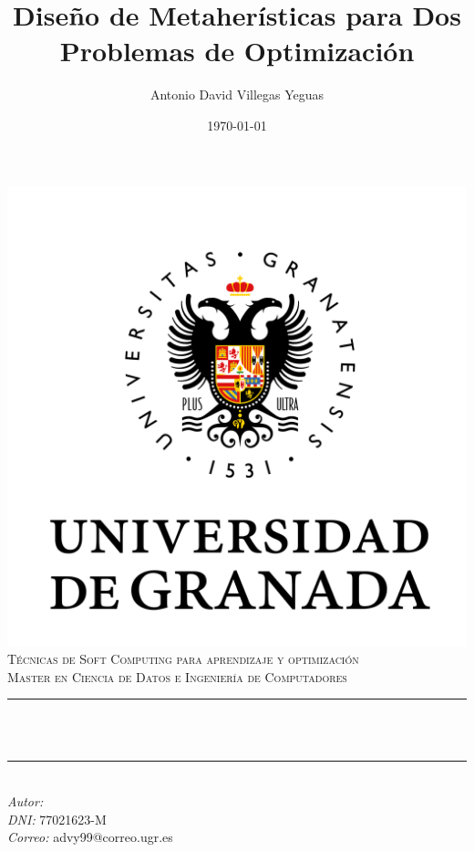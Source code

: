 \documentclass[12pt, spanish]{article}
\title{Diseño de Metaherísticas para Dos Problemas de Optimización}
\author{Antonio David Villegas Yeguas}
\date{\today}
\makeatletter
\let\thetitle\@title
\let\theauthor\@author
\makeatother
\begin{document}


\begin{titlepage}
    \centering
    \vspace*{-2cm}
    \includegraphics[scale = 0.50]{ugr.png}\\[0.3 cm]
    \textsc{\large Técnicas de Soft Computing para aprendizaje y optimización}\\[0.5 cm]
    \textsc{\large Master en Ciencia de Datos e Ingeniería de Computadores}\\[0 cm]
    \rule{\linewidth}{0.2 mm} \\[0.4cm]
    { \Large \bfseries \thetitle}\\
    \rule{\linewidth}{0.2 mm} \\[1 cm]

     {\large
      \emph{Autor: } \theauthor\\
	   \emph{DNI:   }  77021623-M \\
      \emph{Correo:} advy99@correo.ugr.es}


\end{titlepage}
\end{document}
